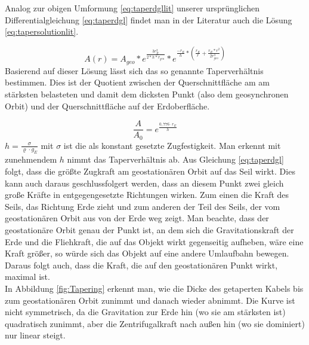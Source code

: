 \documentclass[a4paper, 10pt]{report}
\begin{document}
Analog zur obigen Umformung \ref{eq:taperdgllit} unserer ursprünglichen Differentialgleichung \ref{eq:taperdgl} findet man in der Literatur\cite{PE75} auch die Lösung \ref{eq:tapersolutionlit}.

\begin{equation}
A(r)=A_{geo}*e^\frac{3r_E^2}{2*h*r_{geo}}*e^{\frac{-r_E}{h}*(\frac{r_E}{r}+\frac{r_E*r^2}{2r_{geo}^3})}
\label{eq:tapersolutionlit}
\end{equation}
Basierend auf dieser Lösung lässt sich das so genannte Taperverhältnis bestimmen. Dies ist der Quotient zwischen der Querschnittfläche am am stärksten belasteten und damit dem dicksten Punkt (also dem geosynchronen Orbit) und der Querschnittfläche auf der Erdoberfläche.

\begin{equation}
\frac{A}{A_0} = e^\frac{0,776 \cdot r_E}{h}
\label{eq:taperratio}
\end{equation}
$h=\frac{\sigma}{\varrho \cdot g_E}$ mit $\sigma$ ist die als konstant gesetzte Zugfestigkeit. Man erkennt mit zunehmendem $h$ nimmt das Taperverhältnis ab.
Aus Gleichung \ref{eq:taperdgl} folgt, dass die größte Zugkraft am geostationären Orbit auf das Seil wirkt. Dies kann auch daraus geschlussfolgert werden, dass an diesem Punkt zwei gleich große Kräfte in entgegengesetzte Richtungen wirken. Zum einen die Kraft des Seils, das Richtung Erde zieht und zum anderen der Teil des Seils, der vom geostationären Orbit aus von der Erde weg zeigt. Man beachte, dass der geostationäre Orbit genau der Punkt ist, an dem sich die Gravitationskraft der Erde und die Fliehkraft, die auf das Objekt wirkt gegenseitig aufheben, wäre eine Kraft größer, so würde sich das Objekt auf eine andere Umlaufbahn bewegen. Daraus folgt auch, dass die Kraft, die auf den geostationären Punkt wirkt, maximal ist. \\
In Abbildung \ref{fig:Tapering} erkennt man, wie die Dicke des getaperten Kabels bis zum geostationären Orbit zunimmt und danach wieder abnimmt. Die Kurve ist nicht symmetrisch, da die Gravitation zur Erde hin (wo sie am stärksten ist) quadratisch zunimmt, aber die Zentrifugalkraft nach außen hin (wo sie dominiert) nur linear steigt.
\end{document}
